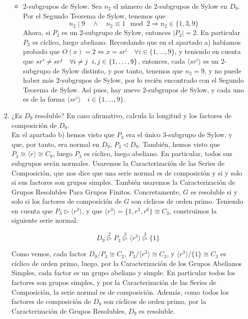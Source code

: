 \documentclass[12pt]{article}
\begin{document}
\begin{ejercicio}[3 puntos]
\begin{enumerate}[label=(\alph*)]
\begin{itemize}
                \item $2$-subgrupos de Sylow. Sea $n_2$ el número de $2$-subgrupos de Sylow en $D_9$. Por el Segundo Teorema de Sylow, tenemos que
                $$n_2 \mid 9 \quad \land \quad n_2 \equiv 1 \mod 2 \Longrightarrow n_2 \in \{1,3,9\}$$
                Ahora, si $P_2$ es un $2$-subgrupo de Sylow, entonces $|P_2| = 2$. En particular $P_2$ es cíclico, luego abeliano. Recordando que en el apartado a) habíamos probado que $O(x) = 2 \iff x = sr^i \quad \forall i \in \{1, \ldots, 9\}$, y teniendo en cuenta que
                $sr^i \neq sr^j \quad \forall i \neq j \hspace{0.2cm} i,j \in \{1, \ldots, 9\}$, entonces, cada $\langle sr^i \rangle$ es un $2$-subgrupo de Sylow distinto, y por tanto, tenemos que $n_2 = 9$, y no puede haber más $2$-subgrupos de Sylow,
                por lo recién encontrado con el Segundo Teorema de Sylow. Así pues, hay nueve $2$-subgrupos de Sylow, y cada uno es de la forma $\langle sr^i \rangle \quad i \in \{1, \ldots, 9\}$. 
            \end{itemize}

            \newpage

            \item ¿Es $D_9$ resoluble? En caso afirmativo, calcula la longitud y los factores de composición de $D_9$. \\

            En el apartado b) hemos visto que $P_3$ era el único $3$-subgrupo de Sylow, y que, por tanto, era normal en $D_9$, $P_3 \vartriangleleft D_9$. También, hemos visto que $P_3 \cong \langle r \rangle \cong C_9$, luego $P_3$ es cíclico, luego abeliano. En particular, todos sus subgrupos
            serán normales. Usaremos la Caracterización de las Series de Composición, que nos dice que una serie normal es de composición y si y solo si sus factores son grupos simples. También usaremos la Caracterización de Grupos Resolubles Para Grupos Finitos. Concretamente, $G$
            es resoluble si y solo si los factores de composición de $G$ son cíclicos de orden primo. Teniendo en cuenta que $P_3 \vartriangleright \langle r^3 \rangle$, y que $\langle r^3 \rangle = \{1, r^3, r^6\} \cong C_3$, construimos la siguiente serie normal: 

            $$D_9 \stackrel{2}{\vartriangleright} P_3 \stackrel{3}{\vartriangleright} \langle r^3 \rangle \stackrel{3}{\vartriangleright} \{1\}$$

            Como vemos, cada factor $D_9/P_3 \cong C_2$, $P_3/\langle r^3 \rangle \cong C_3$, y $\langle r^3 \rangle / \{1\} \cong C_3$ es cíclico de orden primo, luego, por la Caracterización de los Grupos Abelianos Simples, 
            cada factor es un grupo abeliano y simple. En particular todos los factores son grupos simples, y por la Caracterización de las Series de Composición, la serie normal es de composición. Además, como todos los factores de composición de $D_9$ son cíclicos de orden primo,
            por la Caracterización de Grupos Resolubles, $D_9$ es resoluble. \\


\end{enumerate}
\end{ejercicio}
\end{document}
